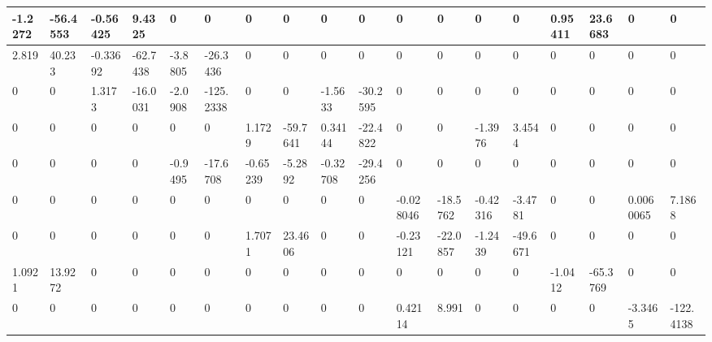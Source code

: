 \begin{tabular}{|l|l|l|l|l|l|l|l|l|l|l|l|l|l|l|l|l|l|}
\hline
-1.2272&-56.4553&-0.56425&9.4325&0&0&0&0&0&0&0&0&0&0&0.95411&23.6683&0&0\\\hline
2.819&40.233&-0.33692&-62.7438&-3.8805&-26.3436&0&0&0&0&0&0&0&0&0&0&0&0\\\hline
0&0&1.3173&-16.0031&-2.0908&-125.2338&0&0&-1.5633&-30.2595&0&0&0&0&0&0&0&0\\\hline
0&0&0&0&0&0&1.1729&-59.7641&0.34144&-22.4822&0&0&-1.3976&3.4544&0&0&0&0\\\hline
0&0&0&0&-0.9495&-17.6708&-0.65239&-5.2892&-0.32708&-29.4256&0&0&0&0&0&0&0&0\\\hline
0&0&0&0&0&0&0&0&0&0&-0.028046&-18.5762&-0.42316&-3.4781&0&0&0.0060065&7.1868\\\hline
0&0&0&0&0&0&1.7071&23.4606&0&0&-0.23121&-22.0857&-1.2439&-49.6671&0&0&0&0\\\hline
1.0921&13.9272&0&0&0&0&0&0&0&0&0&0&0&0&-1.0412&-65.3769&0&0\\\hline
0&0&0&0&0&0&0&0&0&0&0.42114&8.991&0&0&0&0&-3.3465&-122.4138\\\hline
\end{tabular}

